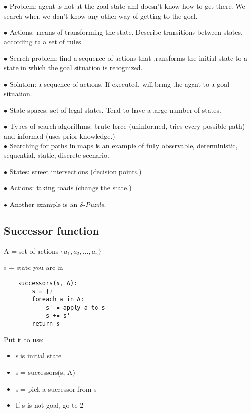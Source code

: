 \documentclass[english,openany]{book}
\begin{document}
    $\bullet$ Problem: agent is not at the goal state and doesn't know how to get there. We search when we don't know any other way of getting to the goal.

    $\bullet$ Actions: means of transforming the state. Describe transitions between states, according to a set of rules.

    $\bullet$ Search problem: find a sequence of actions that transforms the initial state to a state in which the goal situation is recognized.

    $\bullet$ Solution: a sequence of actions. If executed, will bring the agent to a goal situation.

    $\bullet$ State spaces: set of legal states. Tend to have a large number of states.

    $\bullet$ Types of search algorithms: brute-force (uninformed, tries every possible path) and informed (uses prior knowledge.)\\

    $\bullet$ Searching for paths in maps is an example of fully observable, deterministic, sequential, static, discrete scenario.

    $\bullet$ States: street intersections (decision points.)

    $\bullet$ Actions: taking roads (change the state.)

    $\bullet$ Another example is an \textit{8-Puzzle}.\\

    \subsection{Successor function}


    A = set of actions $\{a_1, a_2, ..., a_n\}$

    s = state you are in

    \begin{lstlisting}
    successors(s, A):
        s = {}
        foreach a in A:
            s' = apply a to s
            s += s'
        return s
    \end{lstlisting}

    Put it to use:

    \begin{itemize}
        \item s is initial state
        \item s = successors(s, A)
        \item s = pick a successor from s
        \item If s is not goal, go to 2
    \end{itemize}
\end{document}
